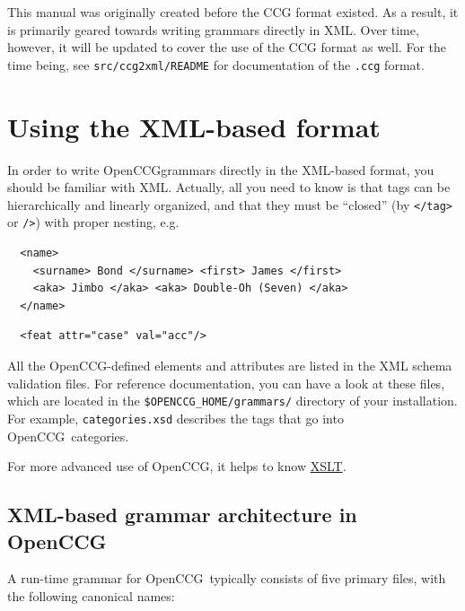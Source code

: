\documentclass[11pt]{article}
\newcommand{\occg}{OpenCCG}
\begin{document}
This manual was originally created before the CCG format existed. As a result,
it is primarily geared towards writing grammars directly in XML. Over time,
however, it will be updated to cover the use of the CCG format as well. For the
time being, see \texttt{src/ccg2xml/README} for documentation of the
\texttt{.ccg} format.


\section{Using the XML-based format}

In order to write \occg grammars directly in the XML-based format, you
should be familiar with XML. Actually, all you need to know is that tags
can be hierarchically and linearly organized, and that they must be
``closed'' (by
\texttt{</tag>} or
\texttt{/>}) with proper nesting, e.g.

\begin{verbatim}
  <name> 
    <surname> Bond </surname> <first> James </first>
    <aka> Jimbo </aka> <aka> Double-Oh (Seven) </aka>
  </name>
\end{verbatim}

\begin{verbatim} 
  <feat attr="case" val="acc"/>
\end{verbatim}

All the \occg-defined elements and attributes are listed in the XML
schema validation files. For reference documentation, you can have a
look at these files, which are located in the
\texttt{\$OPENCCG\_HOME/grammars/} directory of your installation. For
example, \texttt{categories.xsd} describes the tags that go into \occg\
categories.

For more advanced use of \occg, it helps to know
\href{http://www.w3.org/Style/XSL/}{XSLT}.

\subsection{XML-based grammar architecture in \occg}

A run-time grammar for \occg\ typically consists of 
five primary files, with the following canonical names:
\end{document}
